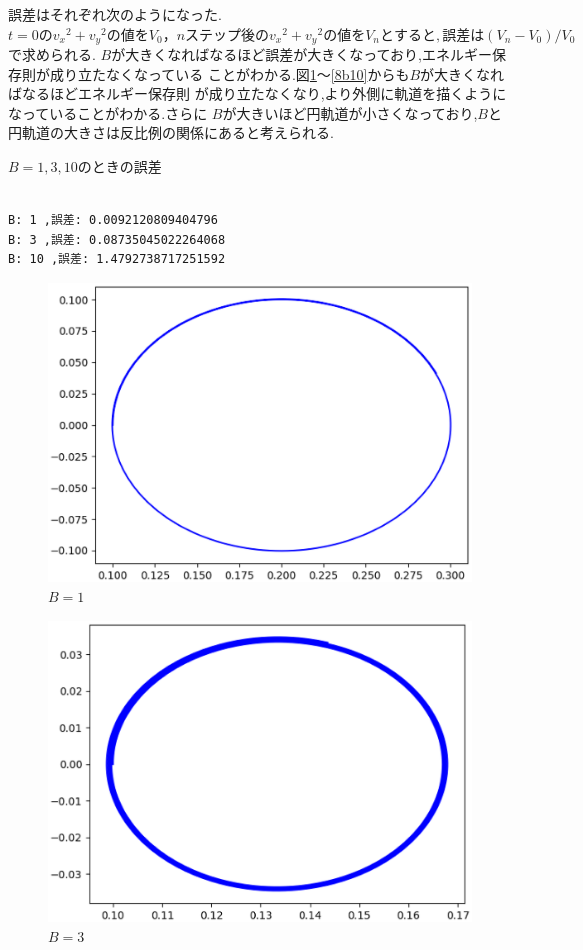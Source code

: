 誤差はそれぞれ次のようになった.$t=0の{v_x}^2+{v_y}^2の値を
V_0，nステップ後の{v_x}^2+{v_y}^2の値をV_nとすると,
誤差は(V_n - V_0)/V_0$で求められる.
$B$が大きくなればなるほど誤差が大きくなっており,エネルギー保存則が成り立たなくなっている
ことがわかる.図\ref{8b1}～\ref{8b10}からも$B$が大きくなればなるほどエネルギー保存則
が成り立たなくなり,より外側に軌道を描くようになっていることがわかる.さらに
$B$が大きいほど円軌道が小さくなっており,$B$と円軌道の大きさは反比例の関係にあると考えられる.
\begin{breakitembox}[l]{$B=1,3,10$のときの誤差}
    \begin{verbatim}

B: 1 ,誤差: 0.0092120809404796
B: 3 ,誤差: 0.08735045022264068
B: 10 ,誤差: 1.4792738717251592
 \end{verbatim}
\end{breakitembox}
\begin{figure}[htbp]
\centering
\includegraphics[scale=0.8]{./img/ka8_b1.eps}
\caption{$B=1$}
\label{8b1}
\end{figure}
\begin{figure}[htbp]
\centering
\includegraphics[scale=0.8]{./img/ka8_b3.eps}
\caption{$B=3$}
\label{8b3}
\end{figure}
